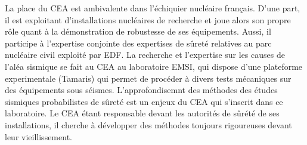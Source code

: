














La place du CEA est ambivalente dans l'échiquier nucléaire français.
D'une part, il est exploitant d'installations nucléaires de recherche 
et joue alors son propre rôle quant à la démonstration de robustesse de ses équipements.
Aussi,
il participe à l'expertise conjointe des expertises de sûreté relatives au parc nucléaire civil exploité par EDF. 
La recherche et l'expertise sur les causes de l'aléa sismique %
se fait au CEA au laboratoire EMSI, qui dispose d'une plateforme experimentale (Tamaris) qui permet de procéder à divers tests mécaniques sur des équipements sous séismes. 
L'approfondisemnt des méthodes des études sismiques probabilistes de sûreté est un enjeux du CEA qui s'inscrit dans ce laboratoire. Le CEA étant responsable devant les autorités de sûrété de ses installations, il cherche %
à développer des méthodes toujours rigoureuses devant leur vieillissement. %



